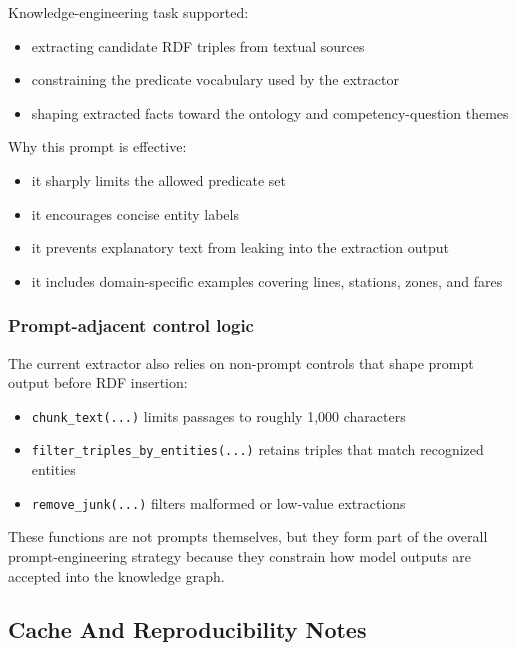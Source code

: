 \documentclass[
  11pt,
  a4paper,
]{article}
\providecommand{\tightlist}{%
  \setlength{\itemsep}{0pt}\setlength{\parskip}{0pt}}
\begin{document}
Knowledge-engineering task supported:

\begin{itemize}
\tightlist
\item
  extracting candidate RDF triples from textual sources
\item
  constraining the predicate vocabulary used by the extractor
\item
  shaping extracted facts toward the ontology and competency-question
  themes
\end{itemize}

Why this prompt is effective:

\begin{itemize}
\tightlist
\item
  it sharply limits the allowed predicate set
\item
  it encourages concise entity labels
\item
  it prevents explanatory text from leaking into the extraction output
\item
  it includes domain-specific examples covering lines, stations, zones,
  and fares
\end{itemize}

\subsubsection{Prompt-adjacent control
logic}\label{prompt-adjacent-control-logic}

The current extractor also relies on non-prompt controls that shape
prompt output before RDF insertion:

\begin{itemize}
\tightlist
\item
  \texttt{chunk\_text(...)} limits passages to roughly 1,000 characters
\item
  \texttt{filter\_triples\_by\_entities(...)} retains triples that match
  recognized entities
\item
  \texttt{remove\_junk(...)} filters malformed or low-value extractions
\end{itemize}

These functions are not prompts themselves, but they form part of the
overall prompt-engineering strategy because they constrain how model
outputs are accepted into the knowledge graph.

\subsection{Cache And Reproducibility
Notes}\label{cache-and-reproducibility-notes}
\end{document}
